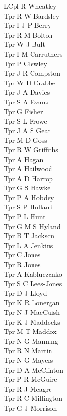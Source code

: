\documentclass[a4paper,7pt]{book}
\begin{document}
\begin{multicols}{4}
  LCpl R Wheatley \\
  Tpr R W Bardsley \\
  Tpr I J P Berry \\
  Tpr R M Bolton \\
  Tpr W J Bult \\
  Tpr I M Carruthers \\
  Tpr P Clewley \\
  Tpr J R Compston \\
  Tpr W D Crabbe \\
  Tpr J A Davies \\
  Tpr S A Evans \\
  Tpr G Fisher \\
  Tpr S L Frowe \\
  Tpr J A S Gear \\
  Tpr M D Goss \\
  Tpr R W Griffiths \\
  Tpr A Hagan \\
  Tpr A Hailwood \\
  Tpr A D Harrop \\
  Tpr G S Hawke \\
  Tpr P A Hobdey \\
  Tpr S P Holland \\
  Tpr P L Hunt \\
  Tpr G M S Hyland \\
  Tpr B T Jackson \\
  Tpr L A Jenkins \\
  Tpr C Jones \\
  Tpr R Jones \\
  Tpr A Kabluczenko \\
  Tpr S C Lees-Jones \\
  Tpr D J Lloyd \\
  Tpr K R Lonergan \\
  Tpr N J MacCuish \\
  Tpr K J Maddocks \\
  Tpr M T Maddox \\
  Tpr N G Manning \\
  Tpr R N Martin \\
  Tpr N G Mayers \\
  Tpr D A McClinton \\
  Tpr P R McGuire \\
  Tpr R J Meagre \\
  Tpr R C Millington \\
  Tpr G J Morrison \\

\end{multicols}
\end{document}
